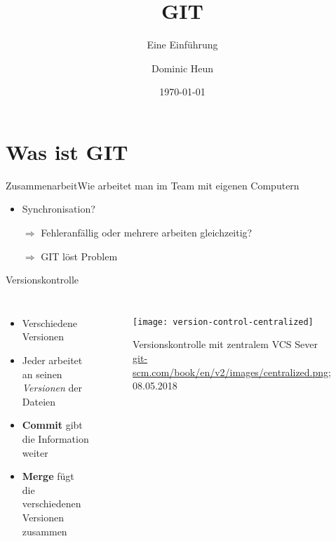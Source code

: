 \documentclass{beamer}
\title{GIT}
\subtitle{Eine Einführung}
\author[Dominic]{Dominic Heun}
\institute{AES Ettlingen - TGJ2/2}
\date{\today}
\begin{document}


  \begin{frame}[plain]
    \titlepage
  \end{frame}

  \section{Was ist GIT}

  \begin{frame}{Zusammenarbeit}{Wie arbeitet man im Team mit eigenen Computern}
    \begin{itemize}[<+->]
      \item Synchronisation?
      \item[$\Rightarrow$] Fehleranfällig oder mehrere arbeiten gleichzeitig?
      \item[$\Rightarrow$] GIT löst Problem
    \end{itemize}
  \end{frame}

  \begin{frame}{Versionskontrolle}
      \begin{columns}

          \begin{itemize}[<+->]
            \item Verschiedene Versionen
            \item Jeder arbeitet an seinen \textit{Versionen} der Dateien
            \item \textbf{Commit} gibt die Information weiter
            \item \textbf{Merge} fügt die verschiedenen Versionen zusammen
          \end{itemize}

          \begin{figure}
            \texttt{[image: version-control-centralized]}
            \caption{
              Versionskontrolle mit zentralem VCS Sever
              \tiny{
                \url{git-scm.com/book/en/v2/images/centralized.png}; 08.05.2018
              }
            }
          \end{figure}
      \end{columns}
  \end{frame}
\end{document}
